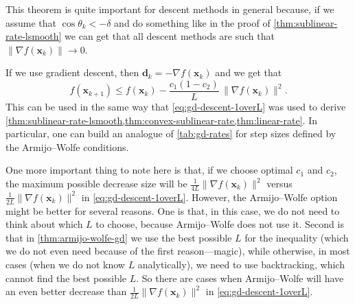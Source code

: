 This theorem is quite important for descent methods in general because, if we assume
that $\cos \theta_k < -\delta$ and do something like in the proof of 
\cref{thm:sublinear-rate-lsmooth} we can get that all descent methods are such
that $\|\nabla f(\mathbf{x}_k)\| \to 0$.

If we use gradient descent, then $\mathbf{d}_k = - \nabla f(\mathbf{x}_k)$ and we get that 
\[
  f(\mathbf{x}_{k+1})\le f(\mathbf{x}_k)-\frac{c_1(1-c_2)}{L}\,\|\nabla f(\mathbf{x}_k)\|^2
.\]
This can be used in the same way that \cref{eq:gd-descent-1overL} was used to derive
\cref{thm:sublinear-rate-lsmooth,thm:convex-sublinear-rate,thm:linear-rate}. In particular, one can
build an analogue of \cref{tab:gd-rates} for step sizes defined by the Armijo--Wolfe conditions.

One more important thing to note here is that, if we choose optimal $c_1$ and $c_2$, the maximum
possible decrease size will be $\frac{1}{4L}\|\nabla f(\mathbf{x}_k)\|^2$ versus
$\frac{1}{2L}\|\nabla f(\mathbf{x}_k)\|^2$ in \cref{eq:gd-descent-1overL}. However, the
Armijo--Wolfe option might be better for several reasons. One is that, in this case, we do not need
to think about which $L$ to choose, because Armijo--Wolfe does not use it. Second is that in
\cref{thm:armijo-wolfe-gd} we use the best possible $L$ for the inequality (which we do not even need
because of the first reason---magic), while otherwise, in most cases (when we do not know $L$
analytically), we need to use backtracking, which cannot find the best possible $L$. So there are
cases when Armijo--Wolfe will have an even better decrease than $\frac{1}{2L}\|\nabla f(\mathbf{x}_k)\|^2$
in \cref{eq:gd-descent-1overL}.
